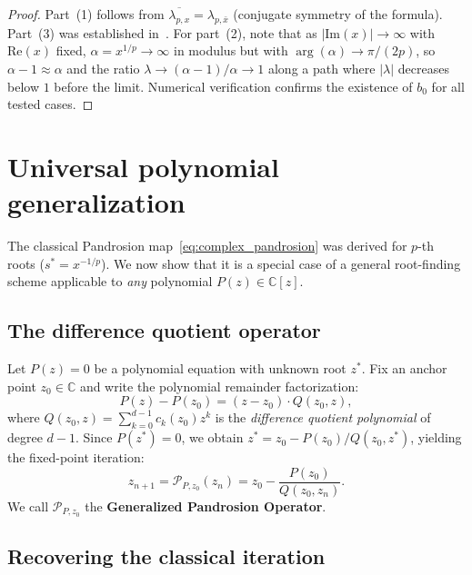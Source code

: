 \documentclass[11pt,a4paper]{article}
\theoremstyle{definition}
\newcommand{\CC}{\mathbb{C}}
\begin{document}
\begin{proof}
Part~(1) follows from $\overline{\lambda_{p,x}} = \lambda_{p,\bar{x}}$ (conjugate symmetry of the formula).  Part~(3) was established in~\cite{besevic2026}.  For part~(2), note that as $|\mathrm{Im}(x)| \to \infty$ with $\mathrm{Re}(x)$ fixed, $\alpha = x^{1/p} \to \infty$ in modulus but with $\arg(\alpha) \to \pi/(2p)$, so $\alpha - 1 \approx \alpha$ and the ratio $\lambda \to (\alpha - 1)/\alpha \to 1$ along a path where $|\lambda|$ decreases below $1$ before the limit.  Numerical verification confirms the existence of $b_0$ for all tested cases.
\end{proof}

\section{Universal polynomial generalization}
\label{sec:universal_poly}

The classical Pandrosion map~\eqref{eq:complex_pandrosion} was derived for $p$-th roots ($s^* = x^{-1/p}$). We now show that it is a special case of a general root-finding scheme applicable to \emph{any} polynomial $P(z) \in \CC[z]$.

\subsection{The difference quotient operator}

Let $P(z) = 0$ be a polynomial equation with unknown root $z^*$. Fix an anchor point $z_0 \in \CC$ and write the polynomial remainder factorization:
\begin{equation}
  P(z) - P(z_0) = (z - z_0) \cdot Q(z_0, z),
\end{equation}
where $Q(z_0, z) = \sum_{k=0}^{d-1} c_k(z_0) z^k$ is the \emph{difference quotient polynomial} of degree $d-1$.  Since $P(z^*) = 0$, we obtain $z^* = z_0 - P(z_0)/Q(z_0, z^*)$, yielding the fixed-point iteration:
\begin{equation}
  \label{eq:pandrosion_generalized}
  \boxed{z_{n+1} = \mathcal{P}_{P, z_0}(z_n) = z_0 - \frac{P(z_0)}{Q(z_0, z_n)}.}
\end{equation}
We call $\mathcal{P}_{P, z_0}$ the \textbf{Generalized Pandrosion Operator}.

\subsection{Recovering the classical iteration}
\end{document}

